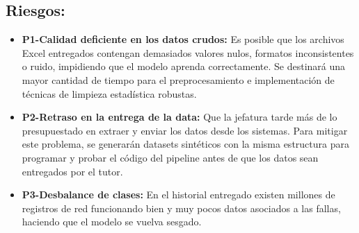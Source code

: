 \documentclass[12pt,a4paper]{article}
\begin{document}
        \subsection{\textbf{Riesgos:}}
                    \begin{itemize}
                        \item \textbf{P1-Calidad deficiente en los datos crudos:} Es posible que los archivos Excel entregados contengan demasiados valores nulos, formatos inconsistentes o ruido, impidiendo que el modelo aprenda correctamente. Se destinará una mayor cantidad de tiempo para el preprocesamiento e implementación de técnicas de limpieza estadística robustas.
                        \item \textbf{P2-Retraso en la entrega de la data:} Que la jefatura tarde más de lo presupuestado en extraer y enviar los datos desde los sistemas. Para mitigar este problema, se generarán datasets sintéticos con la misma estructura para programar y probar el código del pipeline antes de que los datos sean entregados por el tutor.
                        \item \textbf{P3-Desbalance de clases:} En el historial entregado existen millones de registros de red funcionando bien y muy pocos datos asociados a las fallas, haciendo que el modelo se vuelva sesgado.
                    \end{itemize}
\end{document}
